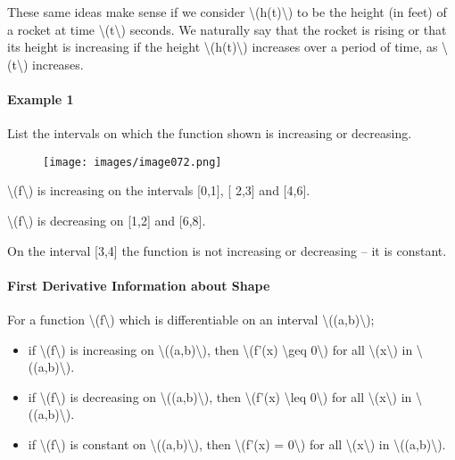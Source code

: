 These same ideas make sense if we consider
\textbackslash{}(h(t)\textbackslash{}) to be the height (in feet) of a
rocket at time \textbackslash{}(t\textbackslash{}) seconds. We naturally
say that the rocket is rising or that its height is increasing if the
height \textbackslash{}(h(t)\textbackslash{}) increases over a period of
time, as \textbackslash{}(t\textbackslash{}) increases.

\hypertarget{example-1}{%
\paragraph{Example 1}\label{example-1}}

List the intervals on which the function shown is increasing or
decreasing.

\begin{figure}
\centering
\texttt{[image: images/image072.png]}
\caption{}
\end{figure}

\textbackslash{}(f\textbackslash{}) is increasing on the intervals
{[}0,1{]}, {[} 2,3{]} and {[}4,6{]}.

\textbackslash{}(f\textbackslash{}) is decreasing on {[}1,2{]} and
{[}6,8{]}.

On the interval {[}3,4{]} the function is not increasing or decreasing
-- it is constant.

\hypertarget{first-derivative-information-about-shape}{%
\paragraph{First Derivative Information about
Shape}\label{first-derivative-information-about-shape}}

For a function \textbackslash{}(f\textbackslash{}) which is
differentiable on an interval \textbackslash{}((a,b)\textbackslash{});

\begin{itemize}
\tightlist
\item
  if \textbackslash{}(f\textbackslash{}) is increasing on
  \textbackslash{}((a,b)\textbackslash{}), then \textbackslash{}(f'(x)
  \textbackslash{}geq 0\textbackslash{}) for all
  \textbackslash{}(x\textbackslash{}) in
  \textbackslash{}((a,b)\textbackslash{}).
\item
  if \textbackslash{}(f\textbackslash{}) is decreasing on
  \textbackslash{}((a,b)\textbackslash{}), then \textbackslash{}(f'(x)
  \textbackslash{}leq 0\textbackslash{}) for all
  \textbackslash{}(x\textbackslash{}) in
  \textbackslash{}((a,b)\textbackslash{}).
\item
  if \textbackslash{}(f\textbackslash{}) is constant on
  \textbackslash{}((a,b)\textbackslash{}), then \textbackslash{}(f'(x) =
  0\textbackslash{}) for all \textbackslash{}(x\textbackslash{}) in
  \textbackslash{}((a,b)\textbackslash{}).
\end{itemize}

